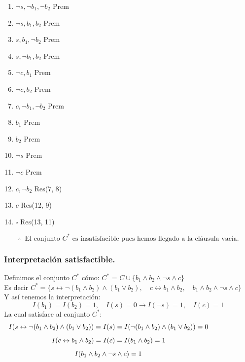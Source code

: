 \documentclass[12pt,letterpaper]{article}
\begin{document}
\begin{enumerate}
  \begin{enumerate}[label=\arabic*.]
  \item $\neg s, \neg b_1, \neg b_2$ \hspace{0.4cm} Prem
  \item $\neg s, b_1, b_2$ \hspace{1cm} Prem
  \item $s, b_1, \neg b_2$ \hspace{1cm} Prem
  \item $s, \neg b_1, b_2$ \hspace{1cm} Prem
  \item $\neg c, b_1$ \hspace{1.5cm} Prem
  \item $\neg c, b_2$ \hspace{1.5cm} Prem
  \item $c, \neg b_1, \neg b_2$ \hspace{0.7cm} Prem
  \item $b_1$ \hspace{2.2cm} Prem
  \item $b_2$ \hspace{2.2cm} Prem
  \item $\neg s$ \hspace{2.1cm} Prem
  \item $\neg c$ \hspace{2.1cm} Prem
  \item $c, \neg b_2$ \hspace{1.6cm} Res(7, 8)
  \item $c$ \hspace{2.4cm} Res(12, 9)
  \item $\square$ \hspace{2.3cm} Res(13, 11)
  \end{enumerate}
  \[
  \therefore \;\; \text{El conjunto } C^* \text{ es insatisfacible pues hemos llegado a la cláusula vacía.}
  \]

  \subsubsection*{Interpretación satisfactible.}
  Definimos el conjunto $C^*$ c\'{o}mo: $C^*$ = $C \cup \{b_1 \land b_2 \land \neg s \land c\}$\\
  Es decir $C^* = \{s \leftrightarrow \neg (b_1 \land b_2) \land (b_1 \lor b_2), \quad c \leftrightarrow b_1 \land b_2, \quad b_1 \land b_2 \land \neg s \land c\}$\\
  Y as\'{i} tenemos la interpretaci\'{o}n:
  \[
  I(b_1) = I(b_2) = 1, \quad I(s) = 0 \rightarrow I(\neg s) = 1, \quad I(c) = 1
  \]
  La cual satisface al conjunto $C^*$:
  \[
  \hspace{-2cm}
  I(s \leftrightarrow \neg (b_1 \land b_2) \land (b_1 \lor b_2)) = I(s) = I(\neg (b_1 \land b_2) \land (b_1 \lor b_2)) = 0
  \]
  \[
  \hspace{-2cm}
  I(c \leftrightarrow b_1 \land b_2) = I(c) = I(b_1 \land b_2) = 1
  \]
  \[
  \hspace{-2cm}
  I(b_1 \land b_2 \land \neg s \land c) = 1
  \]


\end{enumerate}
\end{document}

